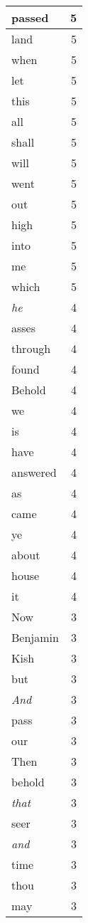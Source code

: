 \begin{center}
\begin{longtable}{l|r}
passed & 5 \\ \hline
land & 5 \\ \hline
when & 5 \\ \hline
let & 5 \\ \hline
this & 5 \\ \hline
all & 5 \\ \hline
shall & 5 \\ \hline
will & 5 \\ \hline
went & 5 \\ \hline
out & 5 \\ \hline
high & 5 \\ \hline
into & 5 \\ \hline
me & 5 \\ \hline
which & 5 \\ \hline
\emph{he} & 4 \\ \hline
asses & 4 \\ \hline
through & 4 \\ \hline
found & 4 \\ \hline
Behold & 4 \\ \hline
we & 4 \\ \hline
is & 4 \\ \hline
have & 4 \\ \hline
answered & 4 \\ \hline
as & 4 \\ \hline
came & 4 \\ \hline
ye & 4 \\ \hline
about & 4 \\ \hline
house & 4 \\ \hline
it & 4 \\ \hline
Now & 3 \\ \hline
Benjamin & 3 \\ \hline
Kish & 3 \\ \hline
but & 3 \\ \hline
\emph{And} & 3 \\ \hline
pass & 3 \\ \hline
our & 3 \\ \hline
Then & 3 \\ \hline
behold & 3 \\ \hline
\emph{that} & 3 \\ \hline
seer & 3 \\ \hline
\emph{and} & 3 \\ \hline
time & 3 \\ \hline
thou & 3 \\ \hline
may & 3 \\ \hline

\end{longtable}
\end{center}
